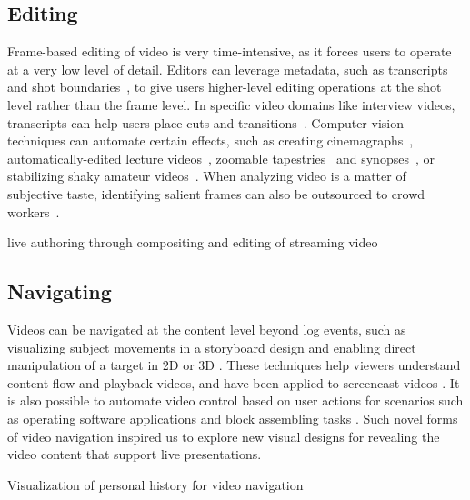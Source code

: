\subsection{Editing}
Frame-based editing of video is very time-intensive, as it forces users to operate at a very low level of detail. Editors can leverage metadata, such as transcripts~\cite{Berthouzoz:2012,Pavel:2014:VDB:2642918.2647400} and shot boundaries~\cite{Casares:2002dx}, to give users higher-level editing operations at the shot level rather than the frame level.
In specific video domains like interview videos, transcripts can help users place cuts and transitions~\cite{Berthouzoz:2012}.
%
Computer vision techniques can automate certain effects, such as creating cinemagraphs~\cite{Bai:2012, Joshi:2012}, automatically-edited lecture videos~\cite{Heck:2007}, zoomable tapestries~\cite{Barnes:2010} and synopses~\cite{Pritch:2009vl}, or stabilizing shaky amateur videos~\cite{Liu:2011}. When analyzing video is a matter of subjective taste, identifying salient frames can also be outsourced to crowd workers~\cite{Bernstein:2011uj}.

live authoring through compositing and editing of streaming video~\cite{Freeman:2014:LLA:2611105.2557304}

\subsection{Navigating}
Videos can be navigated at the content level beyond log events, such as visualizing subject movements in a storyboard design \cite{goldman2006schematic} and enabling direct manipulation of a target in 2D \cite{Dragicevic:2008:VBD:1357054.1357096,Goldman:2008:VOA:1449715.1449719,Karrer:2008:DDM:1357054.1357097} or 3D \cite{Nguyen:2013:DMV:2470654.2466150}. These techniques help viewers understand content flow and playback videos, and have been applied to screencast videos \cite{Denoue:2013:RDM:2451176.2451190}. It is also possible to automate video control based on user actions for scenarios such as operating software applications \cite{Pongnumkul:2011ju} and block assembling tasks \cite{Gupta:2012ku}. Such novel forms of video navigation inspired us to explore new visual designs for revealing the video content that support live presentations.


Visualization of personal history for video navigation~\cite{Al-Hajri:2014:VPH:2611105.2557106}

